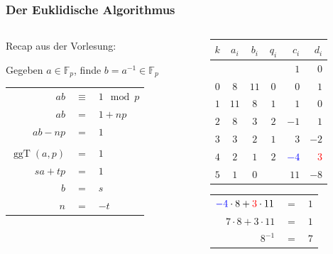 \documentclass[11pt,aspectratio=169]{beamer}
\begin{document}
	\begin{frame}
		\frametitle{Der Euklidische Algorithmus}
	
	\begin{columns}[t]
	\begin{column}{0.50\textwidth}	
	
	Recap aus der Vorlesung:
	
	Gegeben $a \in \mathbb{F}_p$, finde $b = a^{-1} \in \mathbb{F}_p$
	
	\begin{tabular}{rcl}
		$a  b$ &$\equiv$& $1 \mod p$\\
		$a  b$ &$=$& $1 + n  p$\\
		$a  b - n  p$ &$=$& $1$\\
		&&\\
		$\operatorname{ggT}(a,p)$&$=$& $1$\\
		$sa + tp$&$=$& $1$\\
		$b$&$=$&$s$\\
		$n$&$=$&$-t$
	\end{tabular}
	
	\end{column}
	\begin{column}{0.50\textwidth}	
	
	\begin{center}

	\begin{tabular}{| c | c c | c | r r |}
		\hline
		$k$ & $a_i$ & $b_i$ & $q_i$ & $c_i$ & $d_i$\\
		\hline 
		& & & & $1$& $0$\\
		$0$& $8$& $11$& $0$& $0$& $1$\\
		$1$& $11$& $8$& $1$& $1$& $0$\\
		$2$& $8$& $3$& $2$& $-1$& $1$\\
		$3$& $3$& $2$& $1$& $3$& $-2$\\
		$4$& $2$& $1$& $2$& \textcolor{blue}{$-4$}& \textcolor{red}{$3$}\\
		$5$& $1$& $0$& & $11$& $-8$\\
		\hline
	\end{tabular}	
	

	\vspace{10pt}
	
	\begin{tabular}{rcl}
		$\textcolor{blue}{-4} \cdot 8 + \textcolor{red}{3} \cdot 11$ &$=$& $1$\\
		$7 \cdot 8 + 3 \cdot 11$ &$=$& $1$\\
		$8^{-1}$ &$=$& $7$
		
	\end{tabular}
	
	\end{center}
	
	\end{column}
	\end{columns}
	
	\end{frame}
\end{document}
